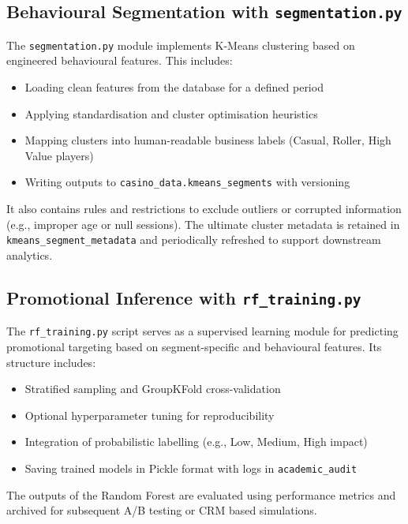\documentclass[12pt,a4paper]{report}
\begin{document}
\subsection{Behavioural Segmentation with \texttt{segmentation.py}}

The \texttt{segmentation.py} module implements K-Means clustering based on engineered behavioural features. This includes:

\begin{itemize}
    \item Loading clean features from the database for a defined period
    \item Applying standardisation and cluster optimisation heuristics
    \item Mapping clusters into human-readable business labels (Casual, Roller, High Value players)
    \item Writing outputs to \texttt{casino\_data.kmeans\_segments} with versioning
\end{itemize}

It also contains rules and restrictions to exclude outliers or corrupted information (e.g., improper age or null sessions).  The ultimate cluster metadata is retained in \texttt{kmeans\_segment\_metadata} and periodically refreshed to support downstream analytics.

\subsection{Promotional Inference with \texttt{rf\_training.py}}

The \texttt{rf\_training.py} script serves as a supervised learning module for predicting promotional targeting based on segment-specific and behavioural features. Its structure includes:

\begin{itemize}
    \item Stratified sampling and GroupKFold cross-validation
    \item Optional hyperparameter tuning for reproducibility
    \item Integration of probabilistic labelling (e.g., Low, Medium, High impact)
    \item Saving trained models in Pickle format with logs in \texttt{academic\_audit}
\end{itemize}

The outputs of the Random Forest are evaluated using performance metrics and archived for subsequent A/B testing or CRM based simulations.
\end{document}

